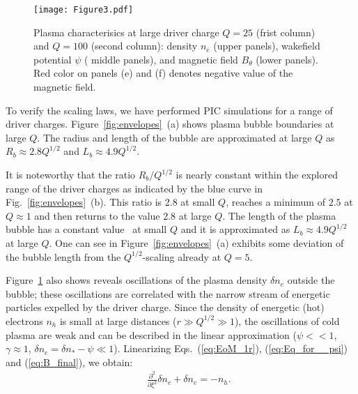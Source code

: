 \documentclass[twocolumn,showpacs,aip]{revtex4}
\begin{document}


\begin{figure}[t]
\centering
	\texttt{[image: Figure3.pdf]}\\
	 \caption{Plasma characterisics at large driver charge $Q=25$ (frist column) and $Q=100$ (second column): density $n_e$ (upper panels), wakefield potential $\psi$ ( middle panels), and magnetic field $B_{\theta}$ (lower panels). Red color on  panels (e) and (f) denotes  negative value of the magnetic field.}
\label{fig:Q}
\end{figure}
 To verify the scaling laws, we have performed  PIC simulations for a range of  driver charges. Figure~\ref{fig:envelopes}~(a) shows plasma bubble boundaries at large $Q$. The  radius  and  length of the  bubble  are approximated at large $Q$ as $R_b \approx 2.8Q^{1/2}$ and $L_b\approx 4.9Q^{1/2}$. 

It is noteworthy that the ratio $R_b/Q^{1/2}$ is nearly constant within the explored range of the driver charges as indicated by  the  blue curve in Fig.~\ref{fig:envelopes}~(b). This ratio is 2.8 at small $Q$,  reaches a minimum of $2.5$ at $Q\approx 1$   and then returns to the value $2.8$ at large $Q$. The length of the plasma bubble has a  constant value~\cite{stupakov_wake_2016} at small $Q$ and it is approximated as $L_b\approx 4.9Q^{1/2}$ at large $Q$. One can see in Figure~\ref{fig:envelopes}~(a) exhibits some deviation of the bubble length from the $Q^{1/2}$-scaling already at $Q=5$.

Figure~\ref{fig:Q} also shows reveals
 oscillations of the plasma density  $\delta n_e$  outside the bubble;  these oscillations  are correlated with the narrow 
stream of  energetic particles expelled by the driver charge. Since the density of energetic (hot) electrons $n_h$ is small at large distances ($r\gg Q^{1/2}\gg 1$),    the oscillations of cold plasma are weak  and can be described  in the linear approximation ($\psi<<1$, $\gamma\approx 1$, $\delta n_e=\delta n_*-\psi\ll 1$).
Linearizing    Eqs.~(\ref{eq:EoM_1r}), (\ref{eq:Eq_for__psi}) and (\ref{eq:B_final}), we obtain:
\begin{eqnarray}
&&\frac{\partial^2}{\partial \xi^2}\delta n_e+\delta n_e=-n_h. 
\label{eq_lin1:n_e}
\end{eqnarray}
\end{document}
